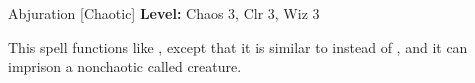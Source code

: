 {Abjuration [Chaotic]}
{
	\textbf{Level:}
	Chaos 3, Clr 3, Wiz 3\\
}
{
	This spell functions like , except that it is similar to  instead of , and it can imprison a nonchaotic called creature.

}
